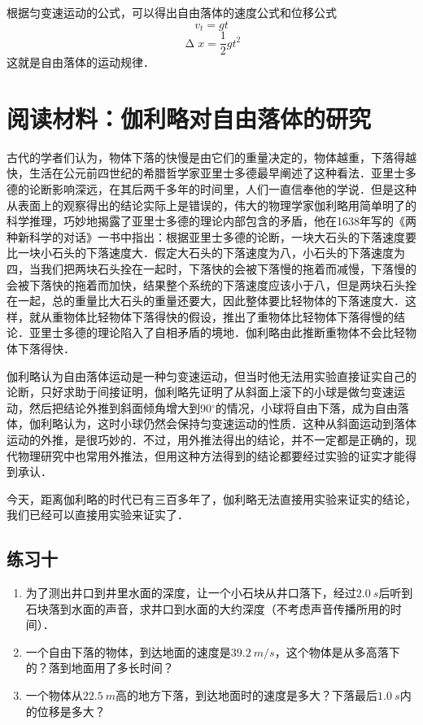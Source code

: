 根据匀变速运动的公式，可以得出自由落体的速度公式和位移公式
\begin{equation}
    v_t=gt
\end{equation}
\begin{equation}
    \upDelta x=\frac{1}{2}gt^2
\end{equation}
这就是自由落体的运动规律．


\section*{阅读材料：伽利略对自由落体的研究}
古代的学者们认为，物体下落的快慢是由它们的重量决定的，物体越重，下落得越快，生活在公元前四世纪的希腊哲学家亚里士多德最早阐述了这种看法．亚里士多德的论断影响深远，在其后两千多年的时间里，人们一直信奉他的学说．但是这种从表面上的观察得出的结论实际上是错误的，伟大的物理学家伽利略用简单明了的科学推理，巧妙地揭露了亚里士多德的理论内部包含的矛盾，他在1638年写的《两种新科学的对话》一书中指出：根据亚里士多德的论断，一块大石头的下落速度要比一块小石头的下落速度大．假定大石头的下落速度为八，小石头的下落速度为四，当我们把两块石头拴在一起时，下落快的会被下落慢的拖着而减慢，下落慢的会被下落快的拖着而加快，结果整个系统的下落速度应该小于八，但是两块石头拴在一起，总的重量比大石头的重量还要大，因此整体要比轻物体的下落速度大．这样，就从重物体比轻物体下落得快的假设，推出了重物体比轻物体下落得慢的结论．亚里士多德的理论陷入了自相矛盾的境地．伽利略由此推断重物体不会比轻物体下落得快．

伽利略认为自由落体运动是一种匀变速运动，但当时他无法用实验直接证实自己的论断，只好求助于间接证明，伽利略先证明了从斜面上滚下的小球是做匀变速运动，然后把结论外推到斜面倾角增大到90$^\circ$的情况，小球将自由下落，成为自由落体，伽利略认为，这时小球仍然会保持匀变速运动的性质．这种从斜面运动到落体运动的外推，是很巧妙的．不过，用外推法得出的结论，并不一定都是正确的，现代物理研究中也常用外推法，但用这种方法得到的结论都要经过实验的证实才能得到承认．

今天，距离伽利略的时代已有三百多年了，伽利略无法直接用实验来证实的结论，我们已经可以直接用实验来证实了．


\subsection*{练习十}
\begin{enumerate}
    \item 为了测出井口到井里水面的深度，让一个小石块从井口落下，经过$\qty{2.0}{s}$后听到石块落到水面的声音，求井口到水面的大约深度（不考虑声音传播所用的时间）．
    \item 一个自由下落的物体，到达地面的速度是$\qty{39.2}{m/s}$，这个物体是从多高落下的？落到地面用了多长时间？
    \item 一个物体从$\qty{22.5}{m}$高的地方下落，到达地面时的速度是多大？下落最后$\qty{1.0}{s}$内的位移是多大？
\end{enumerate}


